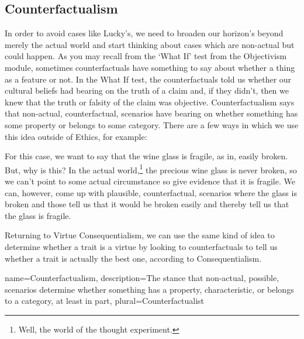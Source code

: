 \subsection{Counterfactualism}

In order to avoid cases like Lucky's, we need to broaden our horizon's beyond merely the actual world and start thinking about cases which are non-actual but could happen. As you may recall from the `What If' test from the Objectivism module, sometimes counterfactuals have something to say about whether a thing as a feature or not. In the What If test, the counterfactuals told us whether our cultural beliefs had bearing on the truth of a claim and, if they didn't, then we knew that the truth or falsity of the claim was objective. \gls{Counterfactualism} says that non-actual, counterfactual, scenarios have bearing on whether something has some property or belongs to some category. There are a few ways in which we use this idea outside of Ethics, for example:


For this case, we want to say that the wine glass is fragile, as in, easily broken. But, why is this? In the actual world,\footnote{Well, the world of the thought experiment.} the precious wine glass is never broken, so we can't point to some actual circumstance so give evidence that it is fragile. We can, however, come up with plausible, counterfactual, scenarios where the glass is broken and those tell us that it would be broken easily and thereby tell us that the glass is fragile. 

Returning to Virtue Consequentialism, we can use the same kind of idea to determine whether a trait is a virtue by looking to counterfactuals to tell us whether a trait is actually the best one, according to Consequentialism. 

{
  name=Counterfactualism,
  description={The stance that non-actual, possible, scenarios determine whether something has a property, characteristic, or belongs to a category, at least in part},
  plural=Counterfactualist
}

